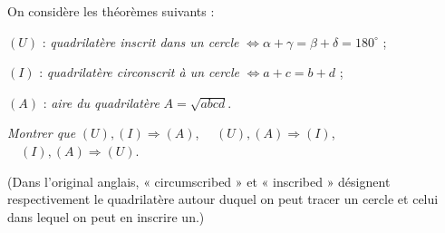 On considère les théorèmes suivants :

$(U)$ : \emph{quadrilatère inscrit dans un cercle} $\iff \alpha + \gamma = \beta + \delta = 180^\circ$ ;

$(I)$ : \emph{quadrilatère circonscrit à un cercle} $\iff a + c = b + d$ ;

$(A)$ : \emph{aire du quadrilatère} $A = \sqrt{abcd}$.

\emph{Montrer que} $(U), (I) \Rightarrow (A)$, $\quad (U), (A) \Rightarrow (I)$, $\quad (I), (A) \Rightarrow (U)$.

(Dans l'original anglais, « circumscribed » et « inscribed » désignent respectivement le quadrilatère autour duquel on peut tracer un cercle et celui dans lequel on peut en inscrire un.)
